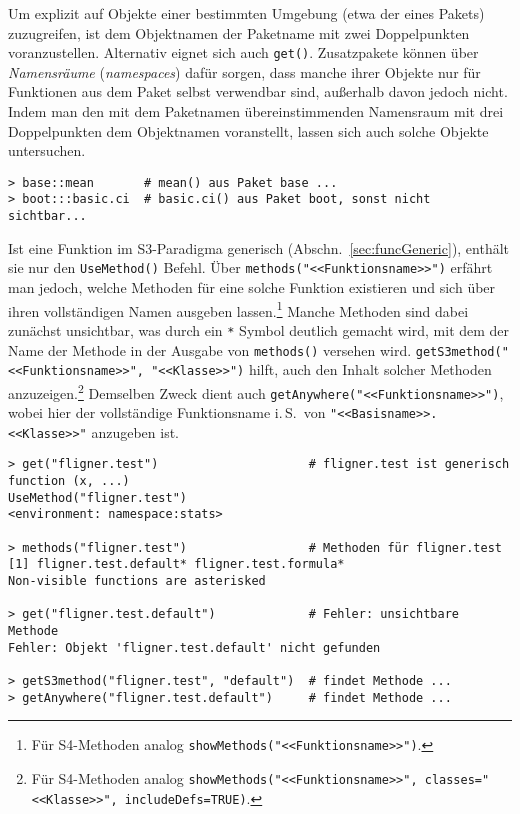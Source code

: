Um explizit auf Objekte einer bestimmten Umgebung (etwa der eines Pakets) zuzugreifen, ist dem Objektnamen der Paketname mit zwei Doppelpunkten voranzustellen. Alternativ eignet sich auch \lstinline!get()!. Zusatzpakete können über \emph{Namensräume} (\emph{namespaces}) dafür sorgen, dass manche ihrer Objekte nur für Funktionen aus dem Paket selbst verwendbar sind, außerhalb davon jedoch nicht. Indem man den mit dem Paketnamen übereinstimmenden Namensraum mit drei Doppelpunkten dem Objektnamen voranstellt, lassen sich auch solche Objekte untersuchen.
\begin{lstlisting}
> base::mean       # mean() aus Paket base ...
> boot:::basic.ci  # basic.ci() aus Paket boot, sonst nicht sichtbar...
\end{lstlisting}

Ist eine Funktion im S3-Paradigma generisch (Abschn.\ \ref{sec:funcGeneric}), enthält sie nur den \lstinline!UseMethod()! Befehl. Über \lstinline!methods("<<Funktionsname>>")! erfährt man jedoch, welche Methoden für eine solche Funktion existieren und sich über ihren vollständigen Namen ausgeben lassen.\footnote{Für S4-Methoden analog \lstinline!showMethods("<<Funktionsname>>")!.} Manche Methoden sind dabei zunächst unsichtbar, was durch ein \lstinline!*! Symbol deutlich gemacht wird, mit dem der Name der Methode in der Ausgabe von \lstinline!methods()! versehen wird. \lstinline!getS3method("<<Funktionsname>>", "<<Klasse>>")! hilft, auch den Inhalt solcher Methoden anzuzeigen.\footnote{Für S4-Methoden analog \lstinline!showMethods("<<Funktionsname>>", classes="<<Klasse>>", includeDefs=TRUE)!.} Demselben Zweck dient auch  \lstinline!getAnywhere("<<Funktionsname>>")!, wobei hier der vollständige Funktionsname i.\,S.\ von \lstinline!"<<Basisname>>.<<Klasse>>"! anzugeben ist.
\begin{lstlisting}
> get("fligner.test")                     # fligner.test ist generisch
function (x, ...)
UseMethod("fligner.test")
<environment: namespace:stats>

> methods("fligner.test")                 # Methoden für fligner.test
[1] fligner.test.default* fligner.test.formula*
Non-visible functions are asterisked

> get("fligner.test.default")             # Fehler: unsichtbare Methode
Fehler: Objekt 'fligner.test.default' nicht gefunden

> getS3method("fligner.test", "default")  # findet Methode ...
> getAnywhere("fligner.test.default")     # findet Methode ...
\end{lstlisting}

